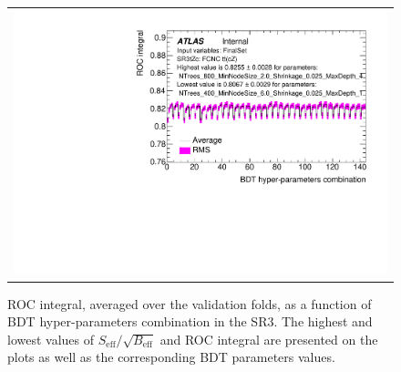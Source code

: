 \begin{figure}[htbp]
	\centering
	\begin{tabular}{c}
		\includegraphics[width=.75\textwidth]{Chapters/CH5/figures/SR3_UsingSMT/BDT/FinalSet/HPO/ROC_integral}
	\end{tabular}
	\caption{ROC integral, averaged over the validation folds,
		as a function of BDT hyper-parameters combination in the SR3. The highest and lowest values of $S_{\text{eff}}/\sqrt{B_{\text{eff}}}$ and ROC integral are presented on the plots as well as
		the corresponding BDT parameters values.}
	\label{app:BDT:fig:SR3:HPO}
\end{figure}


